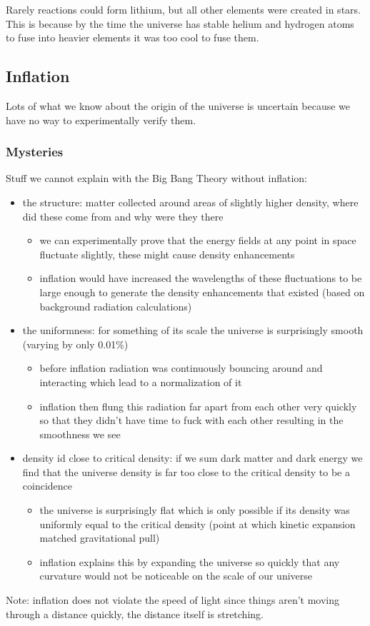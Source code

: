 Rarely reactions could form lithium, but all other elements were created in stars. This is because by the time the universe has stable helium and hydrogen atoms to fuse into heavier elements it was too cool to fuse them.

\subsection{Inflation}
Lots of what we know about the origin of the universe is uncertain because we have no way to experimentally verify them.

\subsubsection{Mysteries}
Stuff we cannot explain with the Big Bang Theory without inflation:
\begin{itemize}
\item the structure: matter collected around areas of slightly higher density, where did these come from and why were they there
\begin{itemize}
\item we can experimentally prove that the energy fields at any point in space fluctuate slightly, these might cause density enhancements
\item inflation would have increased the wavelengths of these fluctuations to be large enough to generate the density enhancements that existed (based on background radiation calculations)
\end{itemize}
\item the uniformness: for something of its scale the universe is surprisingly smooth (varying by only 0.01\%)
\begin{itemize}
\item before inflation radiation was continuously bouncing around and interacting which lead to a normalization of it
\item inflation then flung this radiation far apart from each other very quickly so that they didn't have time to fuck with each other resulting in the smoothness we see
\end{itemize}
\item density id close to critical density: if we sum dark matter and dark energy we find that the universe density is far too close to the critical density to be a coincidence
\begin{itemize}
\item the universe is surprisingly flat which is only possible if its density was uniformly equal to the critical density (point at which kinetic expansion matched gravitational pull)
\item inflation explains this by expanding the universe so quickly that any curvature would not be noticeable on the scale of our universe
\end{itemize}
\end{itemize}
Note: inflation does not violate the speed of light since things aren't moving through a distance quickly, the distance itself is stretching.

